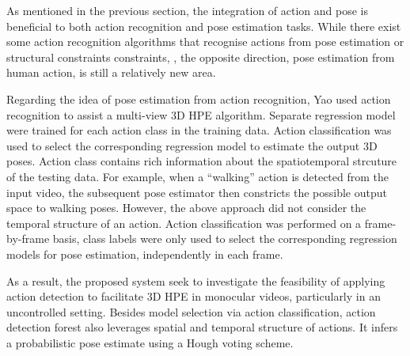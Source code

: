 As mentioned in the previous section, the integration of action and pose is beneficial to both action recognition and pose estimation tasks. 
While there exist some action recognition algorithms that recognise actions from pose estimation or structural constraints constraints, \eg \cite{Yu2010, Raja2011}, the opposite direction, \ie pose estimation from human action, is still a relatively new area. 

Regarding the idea of pose estimation from action recognition, Yao \etal \cite{Yao2012} used action recognition to assist a multi-view 3D HPE algorithm. 
Separate regression model were trained for each action class in the training data. 
Action classification was used to select the corresponding regression model to estimate the output 3D poses. 
Action class contains rich information about the spatiotemporal strcuture of the testing data. For example, when a ``walking'' action is detected from the input video, the subsequent pose estimator then constricts the possible output space to walking poses.   
However, the above approach did not consider the temporal structure of an action.    
Action classification was performed on a frame-by-frame basis, class labels were only used to select the corresponding regression models for pose estimation, independently in each frame.  

As a result, the proposed system seek to investigate the feasibility of applying action detection to facilitate 3D HPE in monocular videos, particularly in an uncontrolled setting. 
Besides model selection via action classification, action detection forest also leverages spatial and temporal structure of actions. It infers a probabilistic pose estimate using a Hough voting scheme.  

